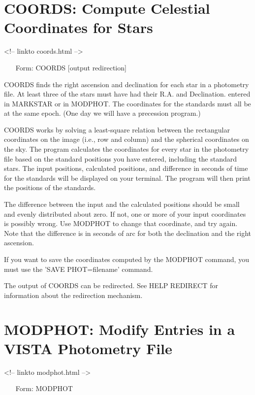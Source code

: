 \section{COORDS: Compute Celestial Coordinates for Stars}
\begin{rawhtml}
<!-- linkto coords.html -->
\end{rawhtml}
\begin{itemize}
  \item[Form: COORDS {[output redirection]}\hfill]{}
\end{itemize}

COORDS finds the right ascension and declination for each star in a
photometry file.  At least three of the stars must have had their R.A. and
Declination. entered in MARKSTAR or in MODPHOT.  The coordinates for the
standards must all be at the same epoch. (One day we will have a precession
program.)

COORDS works by solving a least-square relation between the rectangular
coordinates on the image (i.e., row and column) and the spherical
coordinates on the sky. The program calculates the coordinates for every
star in the photometry file based on the standard positions you have
entered, including the standard stars. The input positions, calculated
positions, and difference in seconds of time for the standards will be
displayed on your terminal. The program will then print the positions of
the standards.

The difference between the input and the calculated positions should be
small and evenly distributed about zero. If not, one or more of your input
coordinates is possibly wrong.  Use MODPHOT to change that coordinate, and
try again.  Note that the difference is in seconds of arc for both the
declination and the right ascension.

If you want to save the coordinates computed by the MODPHOT command, you
must use the 'SAVE PHOT=filename' command.

The output of COORDS can be redirected.  See HELP REDIRECT for information
about the redirection mechanism.

\section{MODPHOT: Modify Entries in a VISTA Photometry File}
\begin{rawhtml}
<!-- linkto modphot.html -->
\end{rawhtml}
\begin{itemize}
  \item[Form: MODPHOT\hfill]{}
\end{itemize}

